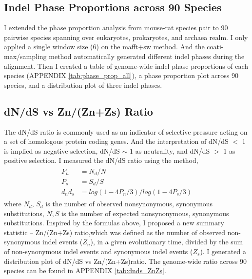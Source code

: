 \subsection{Indel Phase Proportions across 90 Species}
I extended the phase proportion analysis from mouse-rat species pair to 90 pairwise species spanning over eukaryotes, prokaryotes, and archaea realm. I only applied a single window size (6) on the mafft+sw method. And the coati-max/sampling method automatically generated different indel phases during the alignment. Then I created a table of genome-wide indel phase proportions of each species (APPENDIX \ref{tab:phase_prop_all}), a phase proportion plot across 90 species, and a distribution plot of three indel phases.   

\subsection{dN/dS vs Zn/(Zn+Zs) Ratio}
The dN/dS ratio is commonly used as an indicator of selective pressure acting on a set of homologous protein coding genes. And the interpretation of dN/dS $<$ 1 is implied as negative selection, dN/dS $\sim$ 1 as neutrality, and dN/dS $>$ 1 as positive selection. I measured the dN/dS ratio using the \parencite{nei1986simple} method, 
\begin{gather*} 
\begin{aligned}
 P_n  &= N_d/ N \\
 P_s   &= S_d/S \\
 d_{n}d_{s} &= log(1-4P_n/3)/log(1-4P_s/3) 
\end{aligned}
\end{gather*}
where $N_d$, $S_d$ is the number of observed nonsynonymous, synonymous substitutions, $N,S$ is the number of expected nonsynonymous, synonymous substitutions. Inspired by the formulas above, I proposed a new summary statistic -- Zn/(Zn+Zs) ratio,which was defined as the number of observed non-synonymous indel events ($Z_n$), in a given evolutionary time, divided by the sum of non-synonymous indel events and synonymous indel events ($Z_s$). I generated a distribution plot of dN/dS vs Zn/(Zn+Zs)ratio. The genome-wide ratio across 90 species can be found in APPENDIX \ref{tab:dnds_ZnZs}. \\ 
